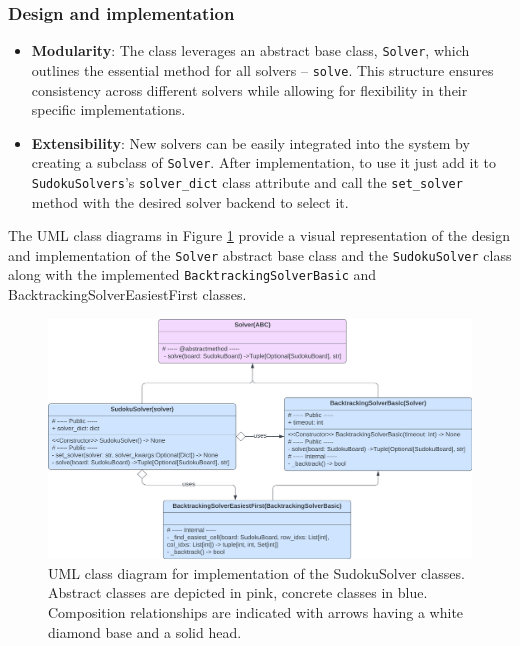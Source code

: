 \documentclass[11pt]{article}
\begin{document}
\subsubsection{Design and implementation}
\begin{itemize}
    \item \textbf{Modularity}: The class leverages an abstract base class, \texttt{Solver}, which outlines the essential method for all solvers -- \texttt{solve}. This structure ensures consistency across different solvers while allowing for flexibility in their specific implementations.
    \item \textbf{Extensibility}: New solvers can be easily integrated into the system by creating a subclass of \texttt{Solver}. After implementation, to use it just add it to \texttt{SudokuSolvers}'s \texttt{solver\_dict} class attribute and call the \texttt{set\_solver} method with the desired solver backend to select it.
\end{itemize}

The UML class diagrams in Figure \ref{fig:sudoku_solver_uml} provide a visual representation of the design and implementation of the \texttt{Solver} abstract base class and the \texttt{SudokuSolver} class along with the implemented \texttt{BacktrackingSolverBasic} and {BacktrackingSolverEasiestFirst} classes.

\begin{figure}[H]
    \centering
    \includegraphics[width=1\textwidth]{figs/UML_sudoku_solver.png}
    \caption{UML class diagram for implementation of the SudokuSolver classes. Abstract classes are depicted in pink, concrete classes in blue. Composition relationships are indicated with arrows having a white diamond base and a solid head.}
    \label{fig:sudoku_solver_uml}
\end{figure}
\end{document}
